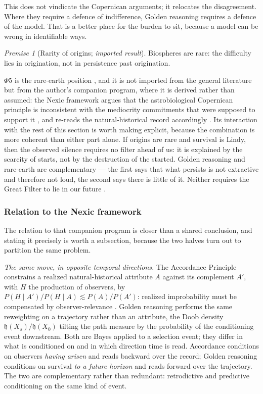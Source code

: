 \documentclass[11pt]{article}
\numberwithin{equation}{section}
\theoremstyle{plain}
\theoremstyle{definition}
\theoremstyle{remark}
\newcommand{\hm}{\mathfrak{h}}
\newtheorem{premise}{Premise}
\begin{document}
This does not vindicate the Copernican arguments; it relocates the
disagreement. Where they require a defence of indifference, Golden
reasoning requires a defence of the model. That is a better place for
the burden to sit, because a model can be wrong in identifiable ways.

\begin{premise}[Rarity of origins; \emph{imported result}]
\label{gr:phi5}
Biospheres are rare: the difficulty lies in origination, not in
persistence past origination.
\end{premise}

$\Phi5$ is the rare-earth position \cite{WB00}, and it is not imported
from the general literature but from the author's companion program,
where it is derived rather than assumed: the Nexic framework
\cite{Ben24Nexus} argues that the astrobiological Copernican principle
is inconsistent with the mediocrity commitments that were supposed to
support it \cite{Ben26Found}, and re-reads the natural-historical record
accordingly \cite{Ben26Optimal}. Its interaction with the rest of this
section is worth making explicit, because the combination is more
coherent than either part alone. If origins are rare and survival is
Lindy, then the observed silence requires no filter ahead of us: it is
explained by the scarcity of starts, not by the destruction of the
started. Golden reasoning and rare-earth are complementary --- the first
says that what persists is not extractive and therefore not loud, the
second says there is little of it. Neither requires the Great Filter to
lie in our future \cite{Han98,SDO18}.

\subsubsection{Relation to the Nexic framework}
\label{gr:subsub:nexic}

The relation to that companion program is closer than a shared
conclusion, and stating it precisely is worth a subsection, because the
two halves turn out to partition the same problem.

\emph{The same move, in opposite temporal directions.} The Accordance
Principle constrains a realized natural-historical attribute $A$ against
its complement $A'$, with $H$ the production of observers, by
$P(H\mid A')/P(H\mid A)\lesssim P(A)/P(A')$: realized improbability must
be compensated by observer-relevance \cite{Ben26Found}. Golden reasoning
performs the same reweighting on a trajectory rather than an attribute,
the Doob density $\hm(X_s)/\hm(X_0)$ tilting the path measure by the
probability of the conditioning event downstream. Both are Bayes applied
to a selection event; they differ in what is conditioned on and in which
direction time is read. Accordance conditions on observers \emph{having
arisen} and reads backward over the record; Golden reasoning conditions
on survival \emph{to a future horizon} and reads forward over the
trajectory. The two are complementary rather than redundant:
retrodictive and predictive conditioning on the same kind of event.
\end{document}
